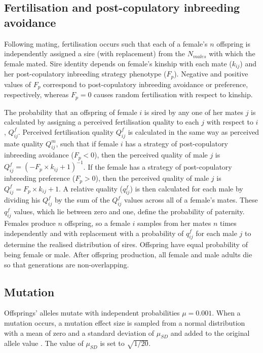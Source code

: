 \documentclass[12pt]{article}
\begin{document}
\subsection*{Fertilisation and post-copulatory inbreeding avoidance}

Following mating, fertilisation occurs such that each of a female's $n$ offspring is independently assigned a sire (with replacement) from the $N_{males}$ with which the female mated. Sire identity depends on female's kinship with each mate ($k_{ij}$) and her post-copulatory inbreeding strategy phenotype ($F_{p}$). Negative and positive values of $F_{p}$ correspond to post-copulatory inbreeding avoidance or preference, respectively, whereas $F_{p}=0$ causes random fertilisation with respect to kinship.

The probability that an offspring of female $i$ is sired by any one of her mates $j$ is calculated by assigning a perceived fertilisation quality to each $j$ with respect to $i$, $Q^{f}_{ij}$. Perceived fertilisation quality $Q^{f}_{ij}$ is calculated in the same way as perceived mate quality $Q^{m}_{ij}$, such that if female $i$ has a strategy of post-copulatory inbreeding avoidance ($F_{p}<0$), then the perceived quality of male $j$ is $Q^{f}_{ij} = (-F_{p} \times k_{ij} + 1)^{-1}$. If the female has a strategy of post-copulatory inbreeding preference ($F_{p}>0$), then the perceived quality of male $j$ is $Q^{f}_{ij} = F_{p} \times k_{ij} + 1$. A relative quality ($q^{f}_{ij}$) is then calculated for each male by dividing his $Q^{f}_{ij}$ by the sum of the $Q^{f}_{ij}$ values across all of a female's mates. These $q^{f}_{ij}$ values, which lie between zero and one, define the probability of paternity. Females produce $n$ offspring, so a female $i$ samples from her mates $n$ times independently and with replacement with a probability of $q^{f}_{ij}$ for each male $j$ to determine the realised distribution of sires. Offspring have equal probability of being female or male. After offspring production, all female and male adults die so that generations are non-overlapping.

\subsection*{Mutation}

Offsprings' alleles mutate with independent probabilities $\mu=0.001$. When a mutation occurs, a mutation effect size is sampled from a normal distribution with a mean of zero and a standard deviation of $\mu_{SD}$ and added to the original allele value \cite[][]{Kimura1965, Lande1976, Bocedi2014, Duthie}. The value of $\mu_{SD}$ is set to $\sqrt{1/20}$.
\end{document}
